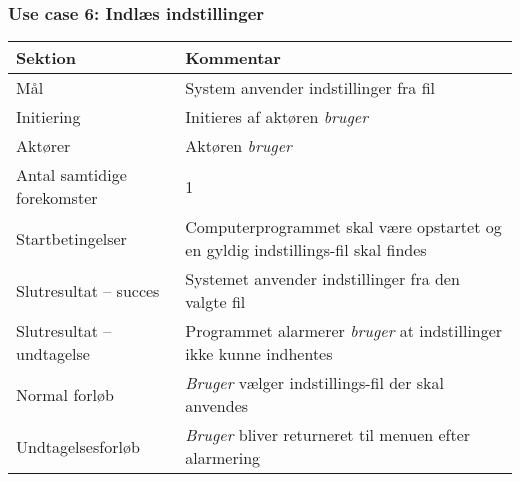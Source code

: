 \documentclass[kravspec.tex]{subfiles}
\begin{document}
	\subsubsection{Use case 6: Indlæs indstillinger}
	\begin{tabular}{|l|p{7.7cm}|}
		\hline \textbf{Sektion} 	& \textbf{Kommentar} \\ 
		\hline Mål  & System anvender indstillinger fra fil \\ 
		\hline Initiering  & Initieres af aktøren \textit{bruger} \\ 
		\hline Aktører & Aktøren \textit{bruger} \\ 
		\hline Antal samtidige forekomster & 1 \\ 
		\hline Startbetingelser & Computerprogrammet skal være opstartet og en gyldig indstillings-fil skal findes  \\ 
		\hline Slutresultat – succes & Systemet anvender indstillinger fra den valgte fil \\ 
		\hline Slutresultat – undtagelse & Programmet alarmerer \textit{bruger} at indstillinger ikke kunne indhentes \\ 
		\hline Normal forløb & \textit{Bruger} vælger indstillings-fil der skal anvendes \\ 
		\hline Undtagelsesforløb & \textit{Bruger} bliver returneret til menuen efter alarmering \\ 
		\hline 
	\end{tabular}
	
\end{document}

